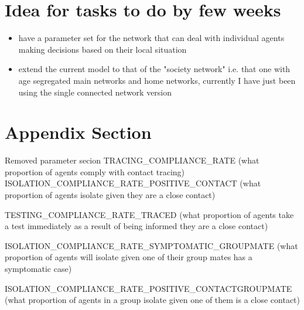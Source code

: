 \documentclass{article}
\begin{document}
\section{Idea for tasks to do by few weeks}
\begin{itemize}
\item have a parameter set for the network that can deal with individual agents making decisions based on their local situation
\item extend the current model to that of the "society network" i.e. that one with age segregated main networks and home networks, currently I have just been using the single connected network version 
\end{itemize}

\appendix

\section{Appendix Section}

Removed parameter secion
TRACING\_COMPLIANCE\_RATE (what proportion of agents comply with contact tracing)
ISOLATION\_COMPLIANCE\_RATE\_POSITIVE\_CONTACT (what proportion of agents isolate given they are a close contact)

TESTING\_COMPLIANCE\_RATE\_TRACED (what proportion of agents take a test immediately as a result of being informed they are a close contact)


\item ISOLATION\_COMPLIANCE\_RATE\_SYMPTOMATIC\_GROUPMATE (what proportion of agents will isolate given one of their group mates has a symptomatic case)

\item ISOLATION\_COMPLIANCE\_RATE\_POSITIVE\_CONTACTGROUPMATE (what proportion of agents in a group isolate given one of them is a close contact)
\end{document}
